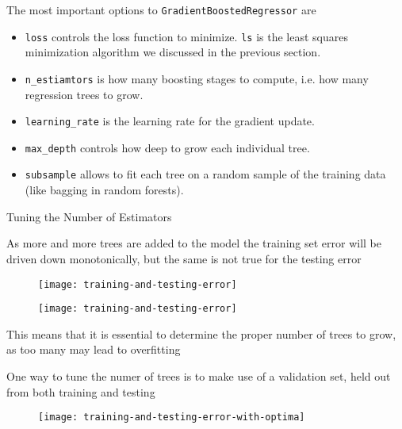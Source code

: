 %
\begin{frame}[fragile]
The most important options to \texttt{GradientBoostedRegressor} are

\begin{itemize}
  \item \texttt{loss} controls the loss function to minimize.  \texttt{ls} is the least squares minimization algorithm we discussed in the previous section.
  \item \texttt{n\_estiamtors} is how many boosting stages to compute, i.e. how many regression trees to grow.
  \item \texttt{learning\_rate} is the learning rate for the gradient update.
  \item \texttt{max\_depth} controls how deep to grow each individual tree.
  \item \texttt{subsample} allows to fit each tree on a random sample of the training data (like bagging in random forests).
\end{itemize}

\end{frame}
%
\begin{frame}{Tuning the Number of Estimators}

As more and more trees are added to the model the training set error will be driven down monotonically, but the same is not true for the testing error

  \begin{figure}
    \texttt{[image: training-and-testing-error]}
  \end{figure}

\end{frame}
%
\begin{frame}

  \begin{figure}
    \texttt{[image: training-and-testing-error]}
  \end{figure}

This means that it is essential to determine the proper number of trees to grow, as too many may lead to overfitting

\end{frame}
%
\begin{frame}
One way to tune the numer of trees is to make use of a validation set, held out from both training and testing

  \begin{figure}
    \texttt{[image: training-and-testing-error-with-optima]}
  \end{figure}
  
\end{frame}
